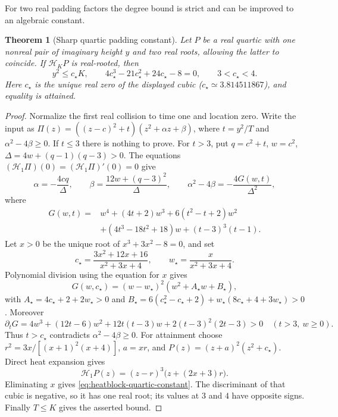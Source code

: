 \documentclass[11pt]{article}
\newtheorem{theorem}{Theorem}[section]
\theoremstyle{definition}
\theoremstyle{remark}
\begin{document}
For two real padding factors the degree bound is strict and can be
improved to an algebraic constant.

\begin{theorem}[Sharp quartic padding constant]
\label{thm:heatblock-quartic}
Let $P$ be a real quartic with one nonreal pair of imaginary height $y$
and two real roots, allowing the latter to coincide.  If
$\mathcal H_KP$ is real-rooted, then
\begin{equation}
 y^2\le c_\star K,
 \qquad
 4c_\star^3-21c_\star^2+24c_\star-8=0,
 \qquad 3<c_\star<4.
 \label{eq:heatblock-quartic-constant}
\end{equation}
Here $c_\star$ is the unique real zero of the displayed cubic
($c_\star\simeq3.814511867$), and equality is attained.
\end{theorem}

\begin{proof}
Normalize the first real collision to time one and location zero.
Write the input as
$\Pi(z)=((z-c)^2+t)(z^2+\alpha z+\beta)$,
where $t=y^2/T$ and $\alpha^2-4\beta\ge0$.
If $t\le3$ there is nothing to prove.  For $t>3$, put
$q=c^2+t$, $w=c^2$, $\Delta=4w+(q-1)(q-3)>0$.
The equations $(\mathcal H_1\Pi)(0)=(\mathcal H_1\Pi)'(0)=0$ give
\[
 \alpha=-\frac{4cq}{\Delta},\qquad
 \beta=\frac{12w+(q-3)^2}{\Delta},\qquad
 \alpha^2-4\beta=-\frac{4G(w,t)}{\Delta^2},
\]
where
\begin{align*}
 G(w,t)={}&w^4+(4t+2)w^3+6(t^2-t+2)w^2\\
 &+(4t^3-18t^2+18)w+(t-3)^3(t-1).
\end{align*}
Let $x>0$ be the unique root of $x^3+3x^2-8=0$, and set
\[
 c_\star=\frac{3x^2+12x+16}{x^2+3x+4},\qquad
 w_\star=\frac{x}{x^2+3x+4}.
\]
Polynomial division using the equation for $x$ gives
\[
 G(w,c_\star)=(w-w_\star)^2(w^2+A_\star w+B_\star),
\]
with
$A_\star=4c_\star+2+2w_\star>0$ and
$B_\star=6(c_\star^2-c_\star+2)+w_\star(8c_\star+4+3w_\star)>0$.
Moreover
\[
 \partial_tG=4w^3+(12t-6)w^2+12t(t-3)w
             +2(t-3)^2(2t-3)>0
 \quad(t>3,\ w\ge0).
\]
Thus $t>c_\star$ contradicts $\alpha^2-4\beta\ge0$.
For attainment choose
$r^2=3x/[(x+1)^2(x+4)]$, $a=xr$, and
$P(z)=(z+a)^2(z^2+c_\star)$.  Direct heat expansion gives
\[
 \mathcal H_1P(z)=(z-r)^3\bigl(z+(2x+3)r\bigr).
\]
Eliminating $x$ gives \eqref{eq:heatblock-quartic-constant}.
The discriminant of that cubic is negative, so it has one real root;
its values at $3$ and $4$ have opposite signs.
Finally $T\le K$ gives the asserted bound.
\end{proof}
\end{document}
